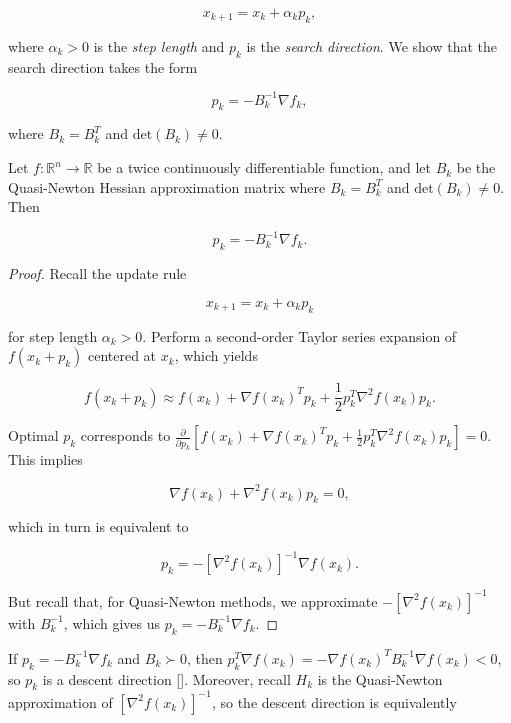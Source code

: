 \documentclass[twoside,11pt]{article}
\begin{document}
\begin{equation}
x_{k+1} = x_k + \alpha_k p_k,
\end{equation}

\noindent
where $\alpha_k > 0$ is the \textit{step length} and $p_k$ is the \textit{search direction}. We show that the search direction takes the form

\begin{equation}
p_k = -B_k^{-1}\nabla f_k,
\end{equation}

\noindent
where $B_k = B_k^T$ and $\text{det}(B_k) \neq 0$.

\begin{theorem}
Let $f: \mathbb{R}^n \rightarrow \mathbb{R}$ be a twice continuously differentiable function, and let $B_k$ be the Quasi-Newton Hessian approximation matrix where $B_k = B_k^T$ and $\text{det}(B_k) \neq 0$. Then

\[
p_k = -B_k^{-1}\nabla f_k.
\]
\end{theorem}

\begin{proof}
Recall the update rule

\[
x_{k+1} = x_k + \alpha_kp_k
\]

\noindent
for step length $\alpha_k > 0$. Perform a second-order Taylor series expansion of $f(x_k + p_k)$ centered at $x_k$, which yields

\[
f(x_k + p_k) \approx f(x_k) + \nabla f(x_k)^T p_k + \frac{1}{2}p_k^T \nabla^2f(x_k)p_k.
\]

\noindent
Optimal $p_k$ corresponds to $\frac{\partial}{\partial p_k} [f(x_k) + \nabla f(x_k)^T p_k + \frac{1}{2}p_k^T \nabla^2f(x_k)p_k]=0$. This implies

\[
\nabla f(x_k) + \nabla^2f(x_k)p_k = 0,
\]

\noindent
which in turn is equivalent to 

\[
p_k = -[\nabla^2f(x_k)]^{-1}\nabla f(x_k).
\]

\noindent
But recall that, for Quasi-Newton methods, we approximate $-[\nabla^2f(x_k)]^{-1}$ with $B_k^{-1}$, which gives us $p_k = -B_k^{-1}\nabla f_k$.
\end{proof}

\noindent
If $p_k = -B_k^{-1}\nabla f_k$ and $B_k \succ 0$, then $p_k^T \nabla f(x_k) = -\nabla f(x_k)^T B_k^{-1} \nabla f(x_k) < 0$, so $p_k$ is a descent direction [\cite{NW06}]. Moreover, recall $H_k$ is the Quasi-Newton approximation of $[\nabla^2f(x_k)]^{-1}$, so the descent direction is equivalently
\end{document}
